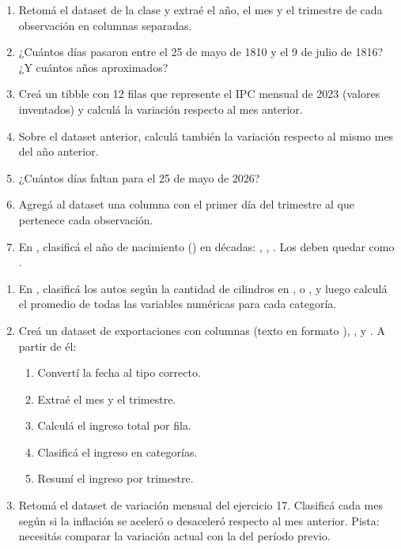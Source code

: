 \documentclass[8pt]{beamer}
\begin{document}
	\begin{frame}[fragile]
		\begin{enumerate}[start=15]
			\item Retomá el dataset  de la clase y extraé el año, el mes y el trimestre de cada observación en columnas separadas.

			\item ¿Cuántos días pasaron entre el 25 de mayo de 1810 y el 9 de julio de 1816? ¿Y cuántos años aproximados?

			\item Creá un tibble con 12 filas que represente el IPC mensual de 2023 (valores inventados) y calculá la variación respecto al mes anterior.

			\item Sobre el dataset anterior, calculá también la variación respecto al mismo mes del año anterior.

			\item ¿Cuántos días faltan para el 25 de mayo de 2026?

			\item Agregá al dataset  una columna con el primer día del trimestre al que pertenece cada observación.

			\item En , clasificá el año de nacimiento () en décadas: , , . Los  deben quedar como .
		\end{enumerate}
	\end{frame}


	\begin{frame}[fragile]
		\begin{enumerate}[start=22]
			\item En , clasificá los autos según la cantidad de cilindros en ,  o , y luego calculá el promedio de todas las variables numéricas para cada categoría.

			\item Creá un dataset de exportaciones con columnas  (texto en formato ), ,  y . A partir de él:
			\begin{enumerate}
				\item Convertí la fecha al tipo correcto.
				\item Extraé el mes y el trimestre.
				\item Calculá el ingreso total por fila.
				\item Clasificá el ingreso en categorías.
				\item Resumí el ingreso por trimestre.
			\end{enumerate}

			\item Retomá el dataset de variación mensual del ejercicio 17. Clasificá cada mes según si la inflación se aceleró o desaceleró respecto al mes anterior. Pista: necesitás comparar la variación actual con la del período previo.
		\end{enumerate}
	\end{frame}
\end{document}
